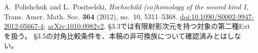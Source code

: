 A.~Polishchuk and L.~Positselski,
\emph{Hochschild (co)homology of the second kind I},
Trans. Amer. Math. Soc. \textbf{364} (2012), no.~10, 5311--5368.
\href{https://doi.org/10.1090/S0002-9947-2012-05667-4}{doi:10.1090/S0002-9947-2012-05667-4};
\href{https://arxiv.org/abs/1010.0982v2}{arXiv:1010.0982v2}.
\S3.3では有限射影次元を持つ対象の第二種Extを扱う。
\S3.5の対角比較条件を、本稿の非可換族について確認済みとはしない。
